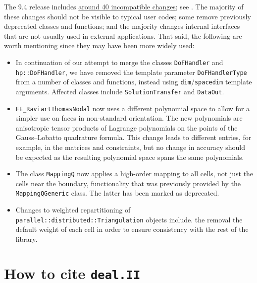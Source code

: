 \documentclass{ansarticle-preprint}
\newcommand{\specialword}[1]{\texttt{#1}}
\newcommand{\dealii}{{\specialword{deal.II}}\xspace}
\begin{document}
The 9.4 release includes
\href{https://dealii.org/developer/doxygen/deal.II/changes_between_9_3_0_and_9_4_0.html}
{around 40 incompatible changes}; see \cite{changes94}. The majority of these changes
should not be visible to typical user codes; some remove previously
deprecated classes and functions; and the majority changes internal
interfaces that are not usually used in external
applications. That said, the following are worth mentioning since they
may have been more widely used:
\begin{itemize}
  \item In continuation of our attempt to merge the classes \texttt{DoFHandler} and \texttt{hp::DoFHandler}, we have removed the
  template parameter \texttt{DoFHandlerType} from a number of classes and
  functions, instead using \texttt{dim}/\texttt{spacedim} template arguments. Affected
  classes include \texttt{SolutionTransfer} and \texttt{DataOut}.
  \item \texttt{FE\_RaviartThomasNodal} now uses a different polynomial space to allow
  for a simpler use on faces in non-standard orientation. The new polynomials
  are anisotropic tensor products of Lagrange polynomials on the points of the
  Gauss--Lobatto quadrature formula. This change leads to different entries, for example, in
  the matrices and constraints, but no change in accuracy should be expected as the resulting polynomial
  space spans the same polynomials.
  \item The class \texttt{MappingQ} now applies a high-order mapping
    to all cells, not just the cells near the boundary, functionality
    that was previously provided by the \texttt{MappingQGeneric}
    class. The latter has been marked as deprecated.
  \item Changes to weighted repartitioning of
    \texttt{parallel::distributed::Triangulation} objects include.
  the removal the default weight of each cell in order to ensure
  consistency with the rest of the library.
\end{itemize}



\section{How to cite \dealii}\label{sec:cite}
\end{document}
